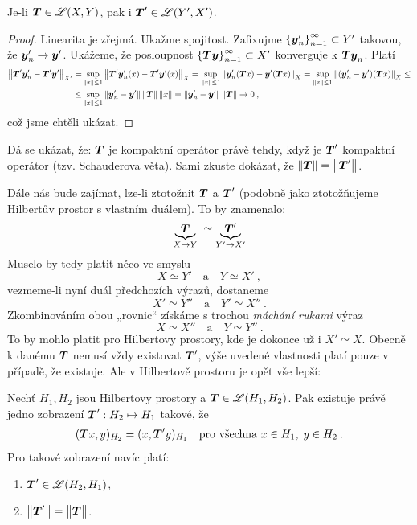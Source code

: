 \begin{lemma}
Je-li $\boldsymbol{T} \in \mathscr{L} (X,Y)$, pak i $\boldsymbol{T}' \in \mathscr{L}(Y', X')$. 
\end{lemma}
\begin{proof}
Linearita je zřejmá. Ukažme spojitost.  Zafixujme $\left \lbrace \boldsymbol{y}'_n \right \rbrace_{n=1}^\infty \subset Y'$ takovou, že $\boldsymbol{y}'_n \rightarrow \boldsymbol{y}'$. Ukážeme, že posloupnost $\left \lbrace \boldsymbol{T} \boldsymbol{y} \right \rbrace_{n=1}^\infty \subset X'$ konverguje k $\boldsymbol{T} \boldsymbol{y}_n$. Platí
\begin{align*}
    \left\lVert\boldsymbol{T}' \boldsymbol{y}'_n - \boldsymbol{T}' \boldsymbol{y}'\right\rVert_{X'} 
    =&
    \sup_{\left\lVert x\right\rVert \leq 1} \left\lVert\boldsymbol{T}' \boldsymbol{y}'_n (x)- \boldsymbol{T}' \boldsymbol{y}' (x)\right\rVert_X 
    =
    \sup_{\left\lVert x\right\rVert \leq 1} \left\lVert\boldsymbol{y}'_n  (\boldsymbol{T} x)- \boldsymbol{y}' (\boldsymbol{T} x)\right\rVert_X 
    =
    \sup_{\left\lVert x\right\rVert \leq 1} \left\lVert(\boldsymbol{y}'_n-\boldsymbol{y}') (\boldsymbol{T} x)\right\rVert_X 
    \leq \\
    \leq&
     \sup_{\left\lVert x\right\rVert \leq 1} \left\lVert\boldsymbol{y}'_n - \boldsymbol{y}'\right\rVert \left\lVert\boldsymbol{T}\right\rVert \left\lVert x\right\rVert
    =
    \left\lVert\boldsymbol{y}'_n -\boldsymbol{y}'\right\rVert \left\lVert\boldsymbol{T}\right\rVert \rightarrow 0\:,
\end{align*}
což jsme chtěli ukázat.
\end{proof}
\begin{remark}
Dá se ukázat, že: $\boldsymbol{T}$ je kompaktní operátor právě tehdy, když je $\boldsymbol{T}'$ kompaktní operátor (tzv. Schauderova věta). Sami zkuste dokázat, že $\left\lVert\boldsymbol{T}\right\rVert = \left\lVert\boldsymbol{T}'\right\rVert$.
\end{remark}

\bigskip

Dále nás bude zajímat, lze-li ztotožnit $\boldsymbol{T}$ a $\boldsymbol{T}'$ (podobně jako ztotožňujeme Hilbertův prostor s vlastním duálem). To by znamenalo:
$$
    \underbrace{\boldsymbol{T}}_{X \to Y} \;\simeq \underbrace{\boldsymbol{T}'}_{Y' \to X'}
$$
Muselo by tedy platit něco ve smyslu
$$ X \simeq Y' \quad \text{a} \quad Y \simeq X' \: , $$
vezmeme-li nyní duál předchozích výrazů, dostaneme
$$ X' \simeq Y'' \quad \text{a} \quad Y' \simeq X'' \: . $$
Zkombinováním obou „rovnic“ získáme s trochou \textit{máchání rukami} výraz
$$ X \simeq X'' \quad \text{a} \quad Y \simeq Y'' \: . $$
To by mohlo platit pro Hilbertovy prostory, kde je dokonce už i $X' \simeq X$. Obecně k danému $\boldsymbol{T}$ nemusí vždy existovat $\boldsymbol{T}'$, výše uvedené vlastnosti platí pouze v případě, že existuje. Ale v Hilbertově prostoru je opět vše lepší:

\begin{theorem}
Nechť $H_1, H_2$ jsou Hilbertovy prostory a $\boldsymbol{T} \in \mathscr{L}(H_1, H_2)$. Pak existuje právě jedno zobrazení $\boldsymbol{T}' : H_2 \mapsto H_1$ takové, že 
\begin{align} \label{eq4.dualHilbert}
    (\boldsymbol{T} x, y)_{H_2} = (x, \boldsymbol{T}'y)_{H_1} \quad \text{pro všechna } x \in H_1, \; y \in H_2 \:.
\end{align}
Pro takové zobrazení navíc platí: \begin{enumerate}
    \item $\boldsymbol{T}' \in \mathscr{L}(H_2, H_1)$,
    \item $\norm{\map T'} = \norm{\map T \vph{\map T'}}$.
\end{enumerate}
\end{theorem}

